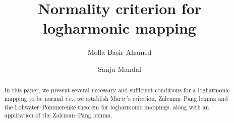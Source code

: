 \documentclass[a4paper,12pt]{amsart}
\theoremstyle{plain}
\theoremstyle{definition}
\newcounter{minutes}\setcounter{minutes}{\time}
\newcounter{hours}\setcounter{hours}{\time}
\begin{document}
\title{Normality criterion for logharmonic mapping}

\author{Molla Basir Ahamed}
\address{Molla Basir Ahamed,
	Department of Mathematics,
	Jadavpur University,
	Kolkata-700032, West Bengal, India.}


\author{Sanju Mandal}
\address{Sanju Mandal,
	Department of Mathematics,
	Jadavpur University,
	Kolkata-700032, West Bengal, India.}




\def\thefootnote{}
 \makeatletter\def\thefootnote{\@arabic\c@footnote}\makeatother



\begin{abstract}
In this paper, we present several necessary and sufficient conditions for a logharmonic mapping to be normal \textit{i.e.}, we establish Marty’s criterion, Zalcman–Pang lemma and the Lohwater–Pommerenke theorem for logharmonic mappings, along with an application of the Zalcman–Pang lemma.
\end{abstract}

\maketitle
\pagestyle{myheadings}
\end{document}
